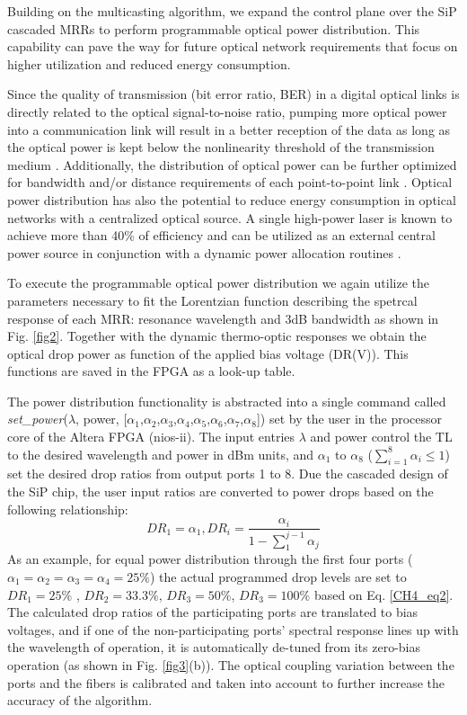 Building on the multicasting algorithm, we expand the control plane over the SiP cascaded MRRs to perform programmable optical power distribution. This capability can pave the way for future optical network requirements that focus on higher utilization and reduced energy consumption. 

Since the quality of transmission (bit error ratio, BER) in a digital optical links is directly related to the optical signal-to-noise ratio, pumping more optical power into a communication link will result in a better reception of the data as long as the optical power is kept below the nonlinearity threshold of the transmission medium \cite{bahadori2015nonlinear}. Additionally, the distribution of optical power can be further optimized for bandwidth and/or distance requirements of each point-to-point link \cite{ramaswami2009optical}. Optical power distribution has also the potential to reduce energy consumption in optical networks with a centralized optical source. A single high-power laser is known to achieve more than 40\% of efficiency \cite{heck2014energy} and can be utilized as an external central power source in conjunction with a dynamic power allocation routines \cite{posca2018powering}. 

To execute the programmable optical power distribution we again utilize the parameters necessary to fit the Lorentzian function describing the spetrcal response of each MRR: resonance wavelength and 3dB bandwidth as shown in Fig. \ref{fig2}. Together with the dynamic thermo-optic responses we obtain the optical drop power as function of the applied bias voltage (DR(V)). This functions are saved in the FPGA as a look-up table.

The power distribution functionality is abstracted into a single command called \textit{set\_power}($\lambda$, power, [$\alpha_1$,$\alpha_2$,$\alpha_3$,$\alpha_4$,$\alpha_5$,$\alpha_6$,$\alpha_7$,$\alpha_8$]) 
set by the user in the processor core of the Altera FPGA (nios-ii). The input entries $\lambda$ and power control the TL \cite{browning2013optical} to the desired wavelength and power in dBm units, and $\alpha_1$ to $\alpha_8$  ($\sum_{i=1}^{8}\alpha_i \leq 1$)  set the desired drop ratios from output ports 1 to 8. Due the cascaded design of the SiP chip, the user input ratios are converted to power drops based on the following relationship:
\begin{equation}\label{CH4_eq2}
DR_1 = \alpha_1, DR_i = \frac{\alpha_i}{1-\sum_{1}^{j-1}\alpha_j}
\end{equation}
As an example, for equal power distribution through the first four ports ($\alpha_1=\alpha_2=\alpha_3=\alpha_4=25 \%$) the actual programmed drop levels are set to $DR_1= 25\%$ , $DR_2= 33.3\%$, $DR_3= 50\%$, $DR_3= 100\%$ based on Eq. \ref{CH4_eq2}. The calculated drop ratios of the participating ports are translated to bias voltages, and if one of the non-participating ports’ spectral response lines up with the wavelength of operation, it is automatically de-tuned from its zero-bias operation (as shown in Fig. \ref{fig3}(b)). The optical coupling variation between the ports and the fibers is calibrated and taken into account to further increase the accuracy of the algorithm. 


